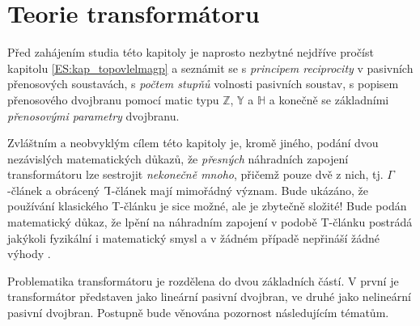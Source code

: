 \chapter{Teorie transformátoru}\label{ES:kap_teorie_trafa}
\minitoc
\newpage
  Před zahájením studia této kapitoly je naprosto nezbytné nejdříve pročíst kapitolu 
  \ref{ES:kap_topovlelmagp} a seznámit se s \emph{principem reciprocity} v pasivních přenosových soustavách, 
  s \emph{počtem stupňů} volnosti pasivních soustav, s popisem přenosového dvojbranu pomocí matic typu 
  \(\mathbb{Z}\), \(\mathbb{Y}\) a \(\mathbb{H}\) a konečně se základními \emph{přenosovými parametry} 
  dvojbranu.
  
  Zvláštním a neobvyklým cílem této kapitoly je, kromě jiného, podání dvou nezávislých matematických důkazů, 
  že \emph{přesných} náhradních zapojení transformátoru lze sestrojit \emph{nekonečně mnoho}, přičemž pouze 
  dvě z nich, tj. \(\Gamma\)-článek a obrácený \(\ammaG\)-článek mají mimořádný význam. Bude ukázáno, že 
  používání klasického T-článku je sice možné, ale je zbytečně složité! Bude podán matematický důkaz, že 
  lpění na náhradním zapojení v podobě T-článku postrádá jakýkoli fyzikální i matematický smysl a v žádném 
  případě nepřináší žádné výhody \cite[s.~340]{Patocka4}. 

  Problematika transformátoru je rozdělena do dvou základních částí. V první je transformátor  představen 
  jako lineární pasivní dvojbran, ve druhé jako nelineární pasivní dvojbran. Postupně  bude věnována 
  pozornost následujícím tématům.

